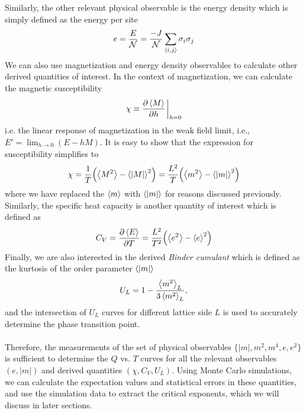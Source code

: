 \documentclass[../journal_main.tex]{subfiles}
\begin{document}
Similarly, the other relevant physical observable is the energy density which is simply defined as the energy per site
\begin{equation}
    e = \frac{E}{\mathcal{N}} = \frac{-J}{\mathcal{N}} \sum_{\expval{i,j}} \sigma_i \sigma_j
\end{equation}  
We can also use magnetization and energy density observables to calculate other derived quantities of interest. In the context of magnetization, we can calculate the magnetic susceptibility 
\begin{equation}
    \chi \equiv \pdv{\expval{M}}{h}\eval_{h=0}
\end{equation}
i.e. the linear response of magnetization in the weak field limit, i.e.,  $\displaystyle E' = \lim_{h \to 0} (E - hM)$. It is easy to show that the expression for susceptibility simplifies to
\begin{equation}
    \chi = \frac{1}{T}\qty(\expval{M^2} - \expval{|M|}^2) = \frac{L^2}{T}\qty(\expval{m^2} - \expval{|m|}^2)
\end{equation}
where we have replaced the $\expval{m}$ with $\expval{|m|}$ for reasons discussed previously. Similarly, the specific heat capacity is another quantity of interest which is defined as 
\begin{equation}
    C_V = \pdv{\expval{E}}{T} = \frac{L^2}{T^2} \qty(\expval{e^2} - \expval{e}^2)
\end{equation}
Finally, we are also interested in the derived \textit{Binder cumulant} which is defined as the kurtosis of the order parameter $\expval{|m|}$
\begin{equation}
    U_L = 1 - \frac{\expval{m^2}_L}{3\expval{m^2}_L},
\end{equation} 
and the intersection of $U_L$ curves for different lattice side $L$ is used to accurately determine the phase transition point.~\\~\\
Therefore, the measurements of the set of physical observables $\{|m|, m^2, m^4, e, e^2\}$ is sufficient to determine the $Q$ vs. $T$ curves for all the relevant observables $(e, |m|)$  and derived quantities $(\chi, C_V, U_L)$. Using Monte Carlo simulations, we can calculate the expectation values and statistical errors in these quantities, and use the simulation data to extract the critical exponents, which we will discuss in later sections.
\end{document}
